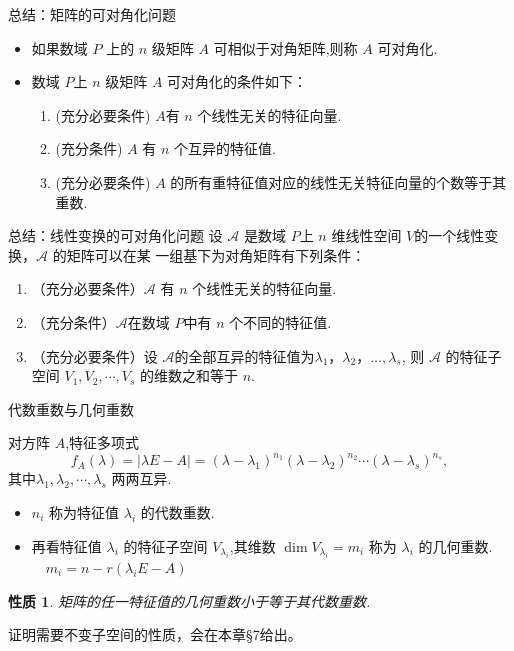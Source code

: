 \documentclass[13pt]{beamer}
\newtheorem*{prop}{性质}
\def\A{\mathscr{A}}
\begin{document}
\begin{frame}{总结：矩阵的可对角化问题}
\begin{itemize}
	\item 如果数域 $P$ 上的 $n$ 级矩阵 $A$ 可相似于对角矩阵,则称 $A$ 可对角化.
	
	\item 数域 $P$上 $n$ 级矩阵 $A$ 可对角化的条件如下：
	\begin{enumerate}
		\item (充分必要条件) $A$有 $n$ 个线性无关的特征向量.
		\item (充分条件) $A$ 有 $n$ 个互异的特征值.
		\item (充分必要条件) $A$ 的所有重特征值对应的线性无关特征向量的个数等于其重数.	
	\end{enumerate}
\end{itemize}
\end{frame}


\begin{frame}{总结：线性变换的可对角化问题}
设 $\A$ 是数域 $P$上 $n$ 维线性空间 $V$的一个线性变换，$\A$ 的矩阵可以在某
一组基下为对角矩阵有下列条件：
\begin{enumerate}
\item （充分必要条件）$\A$ 有 $n$ 个线性无关的特征向量.
\item （充分条件）$\A$在数域 $P$中有 $n$ 个不同的特征值.
\item （充分必要条件）设 $\A$的全部互异的特征值为$\lambda_1，\lambda_2，\ldots , \lambda_s$, 则 $\A$ 的特征子空间 $V_{1},  V_{2},  \cdots,  V_{s}$ 的维数之和等于 $n$.
\end{enumerate}
\end{frame}





\begin{frame}{代数重数与几何重数}

 
对方阵 $A$,特征多项式 $$f_{A}(\lambda)=|\lambda E-A|=\left(\lambda-\lambda_{1}\right)^{n_{1}}\left(\lambda-\lambda_{2}\right)^{n_{2}} \cdots\left(\lambda-\lambda_{s}\right)^{n_{s}},$$ 其中$\lambda_{1}, \lambda_{2}, \cdots, \lambda_{s}$ 两两互异.

\begin{itemize}
	\item $n_{i}$ 称为特征值 $\lambda_{i}$ 的\alert{代数重数}.
	\item 再看特征值 $\lambda_{i}$ 的特征子空间 $V_{\lambda_{i}}$,其维数 $\operatorname{dim} V_{\lambda_{i}}=m_{i}$ 称为 $\lambda_{i}$ 的\alert{几何重数}. $\quad m_{i}=n-r\left(\lambda_{i} E-A\right)$
\end{itemize}

\begin{prop}
	矩阵的任一特征值的几何重数小于等于其代数重数.
\end{prop}
证明需要不变子空间的性质，会在本章\S 7给出。
\end{frame}
\end{document}
